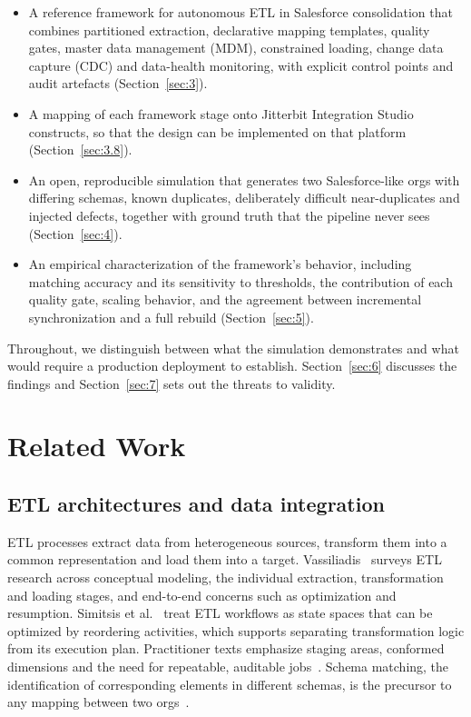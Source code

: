 \begin{itemize}
\item A reference framework for autonomous ETL in Salesforce consolidation that combines partitioned extraction, declarative mapping templates, quality gates, master data management (MDM), constrained loading, change data capture (CDC) and data-health monitoring, with explicit control points and audit artefacts (Section~\ref{sec:3}).
\item A mapping of each framework stage onto Jitterbit Integration Studio constructs, so that the design can be implemented on that platform (Section~\ref{sec:3.8}).
\item An open, reproducible simulation that generates two Salesforce-like orgs with differing schemas, known duplicates, deliberately difficult near-duplicates and injected defects, together with ground truth that the pipeline never sees (Section~\ref{sec:4}).
\item An empirical characterization of the framework's behavior, including matching accuracy and its sensitivity to thresholds, the contribution of each quality gate, scaling behavior, and the agreement between incremental synchronization and a full rebuild (Section~\ref{sec:5}).
\end{itemize}

Throughout, we distinguish between what the simulation demonstrates and what would require a production deployment to establish. Section~\ref{sec:6} discusses the findings and Section~\ref{sec:7} sets out the threats to validity.

\section{Related Work}\label{sec:2}

\subsection{ETL architectures and data integration}\label{sec:2.1}

ETL processes extract data from heterogeneous sources, transform them into a common representation and load them into a target. Vassiliadis~\cite{vassiliadis2009} surveys ETL research across conceptual modeling, the individual extraction, transformation and loading stages, and end-to-end concerns such as optimization and resumption. Simitsis et al.~\cite{simitsis2005} treat ETL workflows as state spaces that can be optimized by reordering activities, which supports separating transformation logic from its execution plan. Practitioner texts emphasize staging areas, conformed dimensions and the need for repeatable, auditable jobs~\cite{kimball2004}. Schema matching, the identification of corresponding elements in different schemas, is the precursor to any mapping between two orgs~\cite{rahm2001}.

